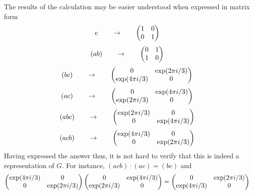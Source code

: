 \documentclass[12pt]{article}
\begin{document}
The results of the calculation may be easier understood when expressed in matrix form
 $$e \qquad \to \qquad \begin{pmatrix} 1 & 0 \cr 0 & 1 \end{pmatrix}$$
 $$(ab) \qquad \to \qquad \begin{pmatrix} 0 & 1 \cr 1 & 0 \end{pmatrix}$$
 $$(bc) \qquad \to \qquad \begin{pmatrix} 0 & \exp(2 \pi i / 3) \cr \exp(4 \pi i / 3) & 0 \end{pmatrix}$$
 $$(ac) \qquad \to \qquad \begin{pmatrix} 0 & \exp(4 \pi i / 3) \cr \exp(2 \pi i / 3) & 0 \end{pmatrix}$$
 $$(abc) \qquad \to \qquad \begin{pmatrix} \exp(2 \pi i / 3) & 0 \cr 0 & \exp(4 \pi i / 3) \end{pmatrix}$$
 $$(acb) \qquad \to \qquad \begin{pmatrix} \exp(4 \pi i / 3) & 0 \cr 0 & \exp(2 \pi i / 3) \end{pmatrix}$$
Having expressed the answer thus, it is not hard to verify that this is indeed a representation of $G$.  For instance, $(acb) \cdot (ac) = (bc)$ and
 $$\begin{pmatrix} \exp(4 \pi i / 3) & 0 \cr 0 & \exp(2 \pi i / 3) \end{pmatrix} \begin{pmatrix} 0 & \exp(4 \pi i / 3) \cr \exp(2 \pi i / 3) & 0 \end{pmatrix} = \begin{pmatrix} 0 & \exp(2 \pi i / 3) \cr \exp(4 \pi i / 3) & 0 \end{pmatrix}$$
\end{document}
